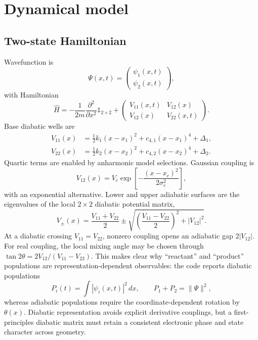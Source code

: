 \documentclass[11pt]{article}
\begin{document}
\section{Dynamical model}

\subsection{Two-state Hamiltonian}

Wavefunction is
\begin{equation}
  \Psi(x,t)=\begin{pmatrix}\psi_1(x,t)\\\psi_2(x,t)\end{pmatrix},
\end{equation}
with Hamiltonian
\begin{equation}
  \hat H = -\frac{1}{2m}\frac{\partial^2}{\partial x^2} \mathbb{1}_{2\times2}
  + \begin{pmatrix}V_{11}(x,t)&V_{12}(x)\\V_{12}(x)&V_{22}(x,t)\end{pmatrix}.
\end{equation}
Base diabatic wells are
\begin{align}
  V_{11}(x) &= \tfrac12 k_1(x-x_1)^2+c_{4,1}(x-x_1)^4+\Delta_1,\\
  V_{22}(x) &= \tfrac12 k_2(x-x_2)^2+c_{4,2}(x-x_2)^4+\Delta_2.
\end{align}
Quartic terms are enabled by anharmonic model selections. Gaussian coupling is
\begin{equation}
  V_{12}(x)=V_c\exp\left[-\frac{(x-x_c)^2}{2\sigma_c^2}\right],
\end{equation}
with an exponential alternative. Lower and upper adiabatic surfaces are the
eigenvalues of the local $2\times2$ diabatic potential matrix,
\begin{equation}
 V_{\pm}(x)=\frac{V_{11}+V_{22}}{2}\pm
 \sqrt{\left(\frac{V_{11}-V_{22}}{2}\right)^2+|V_{12}|^2}.
\end{equation}
At a diabatic crossing $V_{11}=V_{22}$, nonzero coupling opens an adiabatic gap
$2|V_{12}|$. For real coupling, the local mixing angle may be chosen through
$\tan 2\theta=2V_{12}/(V_{11}-V_{22})$. This makes clear why ``reactant'' and
``product'' populations are representation-dependent observables: the code reports
diabatic populations
\begin{equation}
 P_i(t)=\int |\psi_i(x,t)|^2\,dx,\qquad P_1+P_2=\lVert\Psi\rVert^2,
\end{equation}
whereas adiabatic populations require the coordinate-dependent rotation by
$\theta(x)$. Diabatic representation avoids explicit derivative couplings, but a
first-principles diabatic matrix must retain a consistent electronic phase and state
character across geometry.
\end{document}
